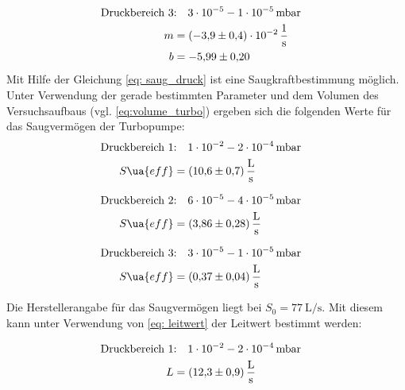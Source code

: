\begin{align}
  \label{eq: regression_turbo_druck_3}
  \begin{aligned}
  \text{Druckbereich 3} &\text{:}\quad \num{3e-5} - \num{1e-05} \, \text{mbar}& \\
  m&=\SI{-3.9\pm0.4 e-2}{\per\second} \\
  b&=\num{-5.99 \pm0.20 }
\end{aligned}
\end{align}
Mit Hilfe der Gleichung \eqref{eq: saug_druck} ist eine Saugkraftbestimmung möglich.
Unter Verwendung der gerade bestimmten Parameter und dem Volumen des Versuchsaufbaus
(vgl. \eqref{eq:volume_turbo}) ergeben sich die folgenden Werte für das Saugvermögen der Turbopumpe:
\begin{align}
  \label{eq:turbo_saug_1}
  \begin{aligned}
    \text{Druckbereich 1} &\text{:}\quad \num{1e-2} - \num{2e-4} \, \text{mbar}& \\
   S\ua{eff}&=\SI{10.6\pm 0.7}{\litre\per\second}
\end{aligned}
\end{align}

\begin{align}
  \label{eq:turbo_saug_2}
  \begin{aligned}
  \text{Druckbereich 2} &\text{:}\quad \num{6e-5} - \num{4e-05} \, \text{mbar}& \\
   S\ua{eff}&=\SI{3.86\pm 0.28}{\litre\per\second}
\end{aligned}
\end{align}

\begin{align}
  \label{eq:turbo_saug_3}
  \begin{aligned}
    \text{Druckbereich 3} &\text{:}\quad \num{3e-5} - \num{1e-05} \, \text{mbar}& \\
   S\ua{eff}&=\SI{0.37\pm 0.04}{\litre\per\second}
\end{aligned}
\end{align}

Die Herstellerangabe für das Saugvermögen liegt bei $S_0=\SI{77}{\liter\per\second}$.
Mit diesem kann unter Verwendung von \eqref{eq: leitwert} der Leitwert bestimmt werden:

\begin{align}
  \label{eq:turbo_leit_1}
  \begin{aligned}
    \text{Druckbereich 1} &\text{:}\quad \num{1e-2} - \num{2e-4} \, \text{mbar}& \\
   L&=\SI{12.3\pm 0.9}{\litre\per\second}
\end{aligned}
\end{align}

